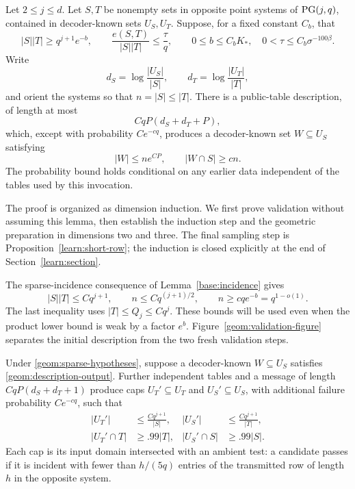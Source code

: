 \begin{lemma}\label{geom:description}
Let $2\leq j\leq d$. Let $S,T$ be nonempty sets in opposite point
systems of $\operatorname{PG}(j,q)$, contained in decoder-known sets $U_S,U_T$.
Suppose, for a fixed constant $C_b$, that
\begin{equation}\label{geom:sparse-hypotheses}
 |S||T|\geq q^{j+1}e^{-b},\qquad
 \frac{e(S,T)}{|S||T|}\leq\frac{\tau}{q},\qquad
 0\leq b\leq C_bK_*,\quad
 0<\tau\leq C_b\sigma^{-100\beta}.
\end{equation}
Write
\[
 d_S=\log\frac{|U_S|}{|S|},\qquad
 d_T=\log\frac{|U_T|}{|T|},
\]
and orient the systems so that $n=|S|\leq |T|$. There is a public-table
description, of length at most
\[
 CqP(d_S+d_T+P),
\]
which, except with probability $Ce^{-cq}$, produces a decoder-known set
$W\subseteq U_S$ satisfying
\begin{equation}\label{geom:description-output}
 |W|\leq ne^{CP},\qquad |W\cap S|\geq cn.
\end{equation}
The probability bound holds conditional on any earlier data independent
of the tables used by this invocation.
\end{lemma}

The proof is organized as dimension induction. We first prove validation
without assuming this lemma, then establish the induction step and the
geometric preparation in dimensions two and three. The final sampling
step is Proposition~\ref{learn:short-row}; the induction is closed
explicitly at the end of Section~\ref{learn:section}.

The sparse-incidence consequence of Lemma~\ref{base:incidence} gives
\begin{equation}\label{geom:product-upper}
 |S||T|\leq Cq^{j+1},\qquad
 n\leq Cq^{(j+1)/2},\qquad n\geq cq e^{-b}=q^{1-o(1)}.
\end{equation}
The last inequality uses $|T|\leq Q_j\leq Cq^j$. These bounds will be
used even when the product lower bound is weak by a factor $e^b$.
Figure~\ref{geom:validation-figure} separates the initial description
from the two fresh validation steps.

\begin{lemma}\label{geom:validation}
Under \eqref{geom:sparse-hypotheses}, suppose a decoder-known
$W\subseteq U_S$ satisfies \eqref{geom:description-output}. Further
independent tables and a message of length
$CqP(d_S+d_T+1)$ produce caps $U_T'\subseteq U_T$ and
$U_S'\subseteq U_S$, with additional failure probability $Ce^{-cq}$,
such that
\begin{equation}\label{geom:validation-output}
 \begin{aligned}
 |U_T'|&\leq \frac{Cq^{j+1}}{|S|},&
 |U_S'|&\leq \frac{Cq^{j+1}}{|T|},\\
 |U_T'\cap T|&\geq .99|T|,&
 |U_S'\cap S|&\geq .99|S|.
 \end{aligned}
\end{equation}
Each cap is its input domain intersected with an ambient test: a candidate
passes if it is incident with fewer than $h/(5q)$ entries of the
transmitted row of length $h$ in the opposite system.
\end{lemma}


